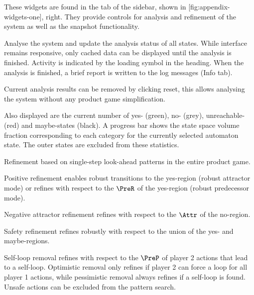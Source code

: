 \startsubject[title=System Widgets]

    These widgets are found in the  tab of the sidebar, shown in [fig:appendix-widgets-one], right.
    They provide controls for analysis and refinement of the system as well as the snapshot functionality.

    \startsubsubject[title={Widget: Analysis}]

        Analyse the system and update the analysis status of all states.
        While interface remains responsive, only cached data can be displayed until the analysis is finished.
        Activity is indicated by the loading symbol in the heading.
        When the analysis is finished, a brief report is written to the log messages (Info tab).

        Current analysis results can be removed by clicking reset, this allows analysing the system without any product game simplification.

        Also displayed are the current number of yes- (green), no- (grey), unreachable- (red) and maybe-states (black).
        A progress bar shows the state space volume fraction corresponding to each category for the currently selected automaton state.
        The outer states are excluded from these statistics.

    \stopsubsubject

    \startsubsubject[title={Widget: Holistic Refinement}]

        Refinement based on single-step look-ahead patterns in the entire product game.

        \startitemize[packed]
            \item{Positive refinement enables robust transitions to the yes-region (robust attractor mode) or refines with respect to the $\PreR$ of the yes-region (robust predecessor mode).}
            \item{Negative attractor refinement refines with respect to the $\Attr$ of the no-region.}
            \item{Safety refinement refines robustly with respect to the union of the yes- and maybe-regions.}
            \item{
                Self-loop removal refines with respect to the $\PreP$ of player 2 actions that lead to a self-loop.
                Optimistic removal only refines if player 2 can force a loop for all player 1 actions, while pessimistic removal always refines if a self-loop is found.
                Unsafe actions can be excluded from the pattern search.
            }
        \stopitemize

